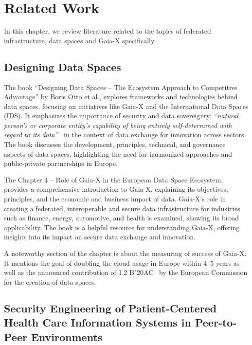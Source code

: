 \chapter{Related Work}\label{ch:related-work}

\begin{chapterabstract}
    In this chapter, we review literature related to the topics of federated infrastructure, data spaces and Gaia-X specifically.
\end{chapterabstract} %

\section{Designing Data Spaces}\label{sec:designing-data-spaces}

The book ``Designing Data Spaces -- The Ecosystem Approach to Competitive Advantage'' by Boris Otto et al., explores frameworks and technologies behind data spaces, focusing on initiatives like Gaia-X and the International Data Spaces (IDS)\cite{designing_dataspaces}.
It emphasizes the importance of security and data sovereignty; \textit{``natural person’s or corporate entity’s capability of being entirely self-determined with regard to its data''}~\cite{designing_dataspaces} in the context of data exchange for innovation across sectors.
The book discusses the development, principles, technical, and governance aspects of data spaces, highlighting the need for harmonized approaches and public-private partnerships in Europe.

The Chapter 4 -- Role of Gaia-X in the European Data Space Ecosystem, provides a comprehensive introduction to Gaia-X, explaining its objectives, principles, and the economic and business impact of data.
Gaia-X's role in creating a federated, interoperable and secure data infrastructure for industries such as finance, energy, automotive, and health is examined, showing its broad applicability.
The book is a helpful resource for understanding Gaia-X, offering insights into its impact on secure data exchange and innovation.

A noteworthy section of the chapter is about the measuring of success of Gaia-X.
It mentions the goal of doubling the cloud usage in Europe within 4--5 years as well as the announced contribution of 1.2 B\char"20AC~ by the European Commission for the creation of data spaces.

\section{Security Engineering of Patient-Centered Health Care Information Systems in Peer-to-Peer Environments}\label{sec:security-engineering-of-patient-centered-health-care-information-systems-in-peer-to-peer-environments}


